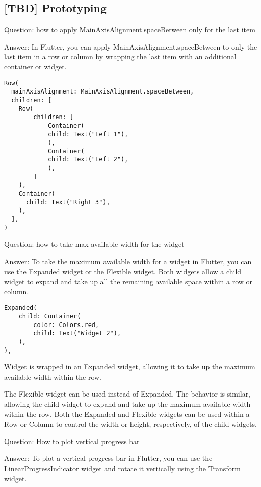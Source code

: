 
\subsection{[TBD] Prototyping}

Question: how to apply MainAxisAlignment.spaceBetween only for the last item

Answer: In Flutter, you can apply MainAxisAlignment.spaceBetween to only the last item in a row or column by 
wrapping the last item with an additional container or widget.

\begin{lstlisting}
Row(
  mainAxisAlignment: MainAxisAlignment.spaceBetween,
  children: [
    Row(
        children: [
            Container(
            child: Text("Left 1"),
            ),
            Container(
            child: Text("Left 2"),
            ),
        ]
    ),
    Container(
      child: Text("Right 3"),
    ),
  ],
)
\end{lstlisting}


Question: how to take max available width for the widget

Answer: To take the maximum available width for a widget in Flutter, you can use the Expanded widget or 
the Flexible widget. Both widgets allow a child widget to expand and take up all the remaining available 
space within a row or column.

\begin{lstlisting}
Expanded(
    child: Container(
        color: Colors.red,
        child: Text("Widget 2"),
    ),
),
\end{lstlisting}

Widget is wrapped in an Expanded widget, allowing it to take up the maximum available width within the row.

The Flexible widget can be used instead of Expanded. The behavior is similar, allowing the 
child widget to expand and take up the maximum available width within the row. Both the Expanded and Flexible 
widgets can be used within a Row or Column to control the width or height, respectively, of the child widgets.


Question: How to plot vertical progress bar

Answer: To plot a vertical progress bar in Flutter, you can use the LinearProgressIndicator widget and rotate 
it vertically using the Transform widget. 

